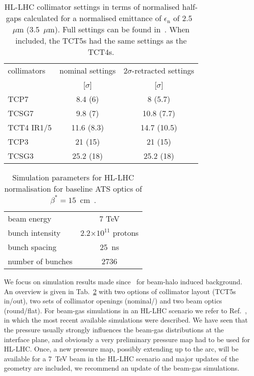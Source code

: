  \begin{table}%
   \centering
   \caption{HL-LHC collimator settings in terms of normalised half-gaps calculated for a normalised emittance of $\epsilon_{\mathrm{n}}$ of 2.5~$\mu$m (3.5~$\mu$m). Full settings can be found in~\cite{collSettRef}. When included, the TCT5s had the same settings as the TCT4s. }

   \begin{tabular}{l|c|c}
       \hline
       collimators &        nominal settings & $2\sigma$-retracted settings\\
                   &         [$\sigma$] &  [$\sigma$]\\
       \hline
       TCP7 & 8.4 (6)& 8 (5.7) \\
       TCSG7 & 9.8 (7) & 10.8 (7.7) \\
       TCT4 IR1/5 & 11.6 (8.3) & 14.7 (10.5) \\
       TCP3 & 21 (15) & 21 (15) \\
       TCSG3 & 25.2 (18) & 25.2 (18)\\
       \hline
   \end{tabular}
   \label{HLcollSettings}
\end{table}

\begin{table}%
   \centering
   \caption{Simulation parameters for HL-LHC normalisation for baseline ATS optics of $\beta^* = 15$~cm~\cite{ATSref}.}
   \begin{tabular}{l|c}
       \hline
       beam energy & 7 TeV \\
       bunch intensity & 2.2$\times 10^{11}$ protons\\
       bunch spacing & 25~ns \\
       number of bunches & 2736 \\
       \hline
   \end{tabular}
   \label{hlscenario}
\end{table}


We focus on simulation results made since~\cite{kweeIpac14} for beam-halo induced background. An overview is given in Tab.~\ref{hlscenario} with two options of collimator layout (TCT5s in/out), two sets of collimator openings (nominal/\twosigmaret) and two beam optics (round/flat). For beam-gas simulations in an HL-LHC scenario we refer to Ref.~\cite{kweeIpac14}, in which the most recent available simulations were described. We have seen that the pressure usually strongly influences the beam-gas distributions at the interface plane, and obviously a very preliminary pressure map had to be used for HL-LHC. Once, a new pressure map, possibly extending up to the arc, will be available for a 7~TeV beam in the HL-LHC scenario and major updates of the geometry are included, we recommend an update of the beam-gas simulations. 

